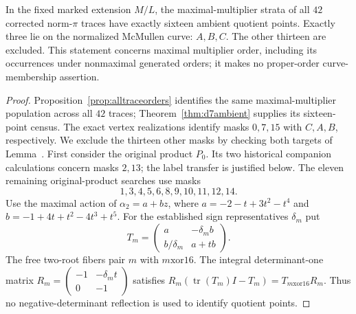 \begin{theorem}\label{thm:maximalallorientations}
In the fixed marked extension $M/L$, the maximal-multiplier strata of all
$42$ corrected norm-$\pi$ traces have exactly sixteen ambient quotient
points. Exactly three lie on the normalized McMullen curve: $A,B,C$.
The other thirteen are excluded. This statement concerns maximal
multiplier order, including its occurrences under nonmaximal generated
orders; it makes no proper-order curve-membership assertion.
\end{theorem}
\begin{proof}
Proposition~\ref{prop:alltraceorders} identifies the same maximal-multiplier
population across all $42$ traces; Theorem~\ref{thm:d7ambient} supplies its
sixteen-point census. The exact vertex realizations identify masks
$0,7,15$ with $C,A,B$, respectively. We exclude the thirteen other
masks by checking both targets of Lemma~.
First consider the original product $P_0$. Its two historical companion
calculations concern masks $2,13$; the label transfer is justified below.
The eleven remaining original-product searches use masks
\[
 1,3,4,5,6,8,9,10,11,12,14.
\]
Use the maximal action of $\alpha_2=a+bz$, where
$a=-2-t+3t^2-t^4$ and $b=-1+4t+t^2-4t^3+t^5$.
For the established sign representatives $\delta_m$ put
\[
 T_m=\begin{pmatrix}a&-\delta_m b\\ b/\delta_m&a+tb\end{pmatrix}.
\]
The free two-root fibers pair $m$ with $m\mathbin{\mathrm{xor}}16$.
The integral determinant-one matrix
$R_m=\left(\begin{smallmatrix}-1&-\delta_m t\\0&-1\end{smallmatrix}\right)$
satisfies
$R_m(\operatorname{tr}(T_m)I-T_m)=T_{m\mathbin{\mathrm{xor}}16}R_m$.
Thus no negative-determinant reflection is used to identify quotient points.


\end{proof}
